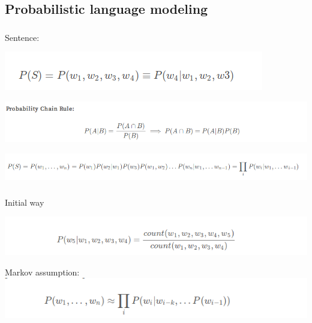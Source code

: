 \documentclass[t, 11pt]{beamer}
\begin{document}
\subsection{Probabilistic language modeling}




	\begin{frame} \label{l2}
	\frametitle{\insertsection}
	\frametitle{\insertsubsection}
	
	Sentence:
	
	\vspace{1cm}
	\includegraphics[width=0.7\linewidth]{sent.png}
	
	\vspace{1cm}
	
	\includegraphics[width=1\linewidth]{chain_rule.png}
	
		\includegraphics[width=1\linewidth]{sent_chain.png}
\end{frame}


	\begin{frame}
	\frametitle{\insertsection}
	\frametitle{\insertsubsection}
	
	Initial way
	
	\vspace{1cm}
	\includegraphics[width=0.9\linewidth]{1.png}
	
	\vspace{1cm}
	
	Markov assumption:
	\includegraphics[width=1\linewidth]{mark_a.png}
	
\end{frame}
\end{document}
